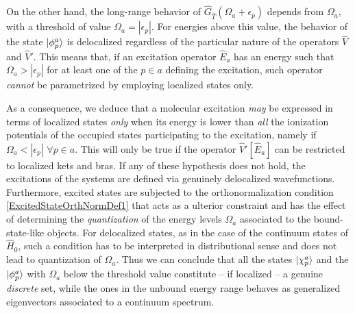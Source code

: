 \documentclass[reprint,aps,prb]{revtex4-1}
\newcommand{\eps}{\epsilon}
\newcommand{\op}[1]{\hat {#1}}
\newcommand{\hnot}{\op{H}_0}
\newcommand{\GH}{\op G_{\op T}}
\begin{document}
On the other hand, the long-range behavior of $\GH(\Omega_a+\eps_p)$ depends from
$\Omega_a$, with a threshold of value $\Omega_a=|\eps_p|$.
For energies above this value, the behavior of the state $\ket{\phi^a_p}$ is
delocalized regardless of the particular nature of the operators $\op V$ and $\op V'$.
This means that, if an excitation operator $\op E_a$ has an energy such that
$\Omega_a>|\eps_p|$  for at least one of the $p \in a$ defining the excitation,
such operator \emph{cannot} be parametrized by employing localized states only.

As a consequence, we deduce that a molecular excitation \emph{may} be expressed in terms of localized states
\emph{only} when its energy is lower than \emph{all} the ionization potentials of the occupied states participating to the excitation,
namely if $\Omega_a<|\eps_p|$ $\forall p \in a$. This will only be true if the operator
$\op V'[\op E_a]$ can be restricted to localized kets and bras.
If any of these hypothesis does not hold, the excitations of the systems are defined via genuinely delocalized wavefunctions.
Furthermore, excited states are subjected to the orthonormalization condition
\eqref{ExcitedStateOrthNormDef1} that acts as a ulterior constraint and has the effect of determining the \emph{quantization}
of the energy levels $\Omega_a$ associated to the bound-state-like objects.
For delocalized states, as in the case of the continuum states of $\hnot$,
such a condition has to be interpreted in distributional sense and does not lead to quantization of $\Omega_a$.
Thus we can conclude that all the states $\ket{\chi^a_p}$ and the $\ket{\phi^a_p}$ with $\Omega_a$ below the threshold value constitute
-- if localized -- a genuine \emph{discrete} set, while the ones in the unbound energy range behaves as generalized eigenvectors associated to a
continuum spectrum.
\end{document}
